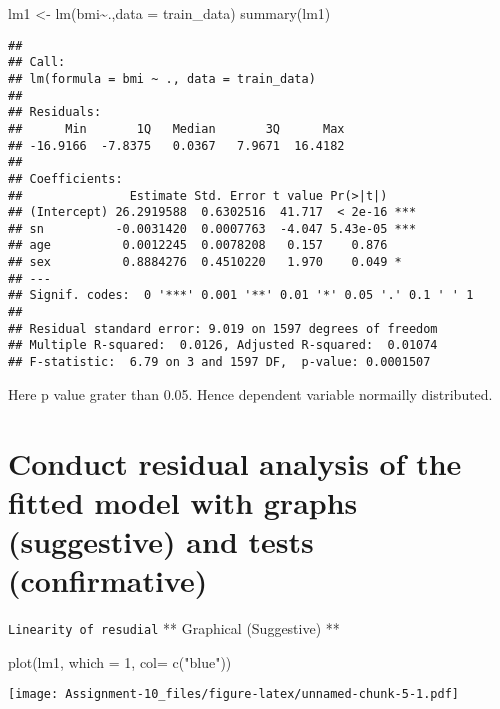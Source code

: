 \documentclass[
]{article}
\newenvironment{Shaded}{\begin{snugshade}}{\end{snugshade}}
\newcommand{\AttributeTok}[1]{\textcolor[rgb]{0.77,0.63,0.00}{#1}}
\newcommand{\DecValTok}[1]{\textcolor[rgb]{0.00,0.00,0.81}{#1}}
\newcommand{\FunctionTok}[1]{\textcolor[rgb]{0.00,0.00,0.00}{#1}}
\newcommand{\NormalTok}[1]{#1}
\newcommand{\OtherTok}[1]{\textcolor[rgb]{0.56,0.35,0.01}{#1}}
\newcommand{\SpecialCharTok}[1]{\textcolor[rgb]{0.00,0.00,0.00}{#1}}
\newcommand{\StringTok}[1]{\textcolor[rgb]{0.31,0.60,0.02}{#1}}
\begin{document}
\begin{Shaded}
\begin{Highlighting}[]
\NormalTok{lm1 }\OtherTok{\textless{}{-}} \FunctionTok{lm}\NormalTok{(bmi}\SpecialCharTok{\textasciitilde{}}\NormalTok{.,}\AttributeTok{data =}\NormalTok{ train\_data)}
\FunctionTok{summary}\NormalTok{(lm1)}
\end{Highlighting}
\end{Shaded}

\begin{verbatim}
## 
## Call:
## lm(formula = bmi ~ ., data = train_data)
## 
## Residuals:
##      Min       1Q   Median       3Q      Max 
## -16.9166  -7.8375   0.0367   7.9671  16.4182 
## 
## Coefficients:
##               Estimate Std. Error t value Pr(>|t|)    
## (Intercept) 26.2919588  0.6302516  41.717  < 2e-16 ***
## sn          -0.0031420  0.0007763  -4.047 5.43e-05 ***
## age          0.0012245  0.0078208   0.157    0.876    
## sex          0.8884276  0.4510220   1.970    0.049 *  
## ---
## Signif. codes:  0 '***' 0.001 '**' 0.01 '*' 0.05 '.' 0.1 ' ' 1
## 
## Residual standard error: 9.019 on 1597 degrees of freedom
## Multiple R-squared:  0.0126, Adjusted R-squared:  0.01074 
## F-statistic:  6.79 on 3 and 1597 DF,  p-value: 0.0001507
\end{verbatim}

Here p value grater than 0.05. Hence dependent variable normailly
distributed.

\hypertarget{conduct-residual-analysis-of-the-fitted-model-with-graphs-suggestive-and-tests-confirmative}{%
\section{Conduct residual analysis of the fitted model with graphs
(suggestive) and tests
(confirmative)}\label{conduct-residual-analysis-of-the-fitted-model-with-graphs-suggestive-and-tests-confirmative}}

\texttt{Linearity\ of\ resudial} ** Graphical (Suggestive) **

\begin{Shaded}
\begin{Highlighting}[]
\FunctionTok{plot}\NormalTok{(lm1, }\AttributeTok{which =} \DecValTok{1}\NormalTok{, }\AttributeTok{col=} \FunctionTok{c}\NormalTok{(}\StringTok{"blue"}\NormalTok{))}
\end{Highlighting}
\end{Shaded}

\texttt{[image: Assignment-10\_files/figure-latex/unnamed-chunk-5-1.pdf]}
\end{document}
